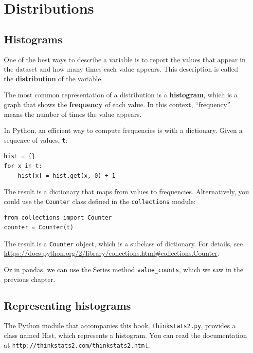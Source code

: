 \documentclass[12pt]{book}
\begin{document}
\chapter{Distributions}
\label{descriptive}


\section{Histograms}
\label{histograms}

One of the best ways to describe a variable is to report the values
that appear in the dataset and how many times each value appears.
This description is called the {\bf distribution} of the variable.

The most common representation of a distribution is a {\bf histogram},
which is a graph that shows the {\bf frequency} of each value.  In
this context, ``frequency'' means the number of times the value
appears.   

In Python, an efficient way to compute frequencies is with a
dictionary.  Given a sequence of values, {\tt t}:
%
\begin{verbatim}
hist = {}
for x in t:
    hist[x] = hist.get(x, 0) + 1
\end{verbatim}

The result is a dictionary that maps from values to frequencies.
Alternatively, you could use the {\tt Counter} class defined in the
{\tt collections} module:

\begin{verbatim}
from collections import Counter
counter = Counter(t)
\end{verbatim}

The result is a {\tt Counter} object, which is a subclass of
dictionary.  For details, see
\url{https://docs.python.org/2/library/collections.html#collections.Counter}.

Or in pandas, we can use the
Series method \verb"value_counts", which we saw in the previous
chapter.


\section{Representing histograms}

The Python module that accompanies this book, {\tt thinkstats2.py},
provides a class named Hist, which represents a histogram.  You can
read the documentation at {\tt http://thinkstats2.com/thinkstats2.html}.
\end{document}
